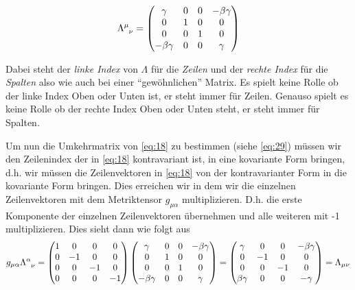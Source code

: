 \begin{equation}
  \label{eq:18}
    \Lambda^\mu_{\hphantom\mu \nu} =
  \begin{pmatrix}
    \gamma&0&0&-\beta\gamma\\
    0&1&0&0\\
    0&0&1&0\\
    -\beta\gamma&0&0&\gamma
  \end{pmatrix}
\end{equation}

Dabei steht der \emph{linke Index} von \(\Lambda\) für die \emph{Zeilen} und
der \emph{rechte Index} für die \emph{Spalten} also wie auch bei einer
``gewöhnlichen'' Matrix. Es spielt keine Rolle ob der linke Index Oben oder
Unten ist, er steht immer für Zeilen. Genauso spielt es keine Rolle ob der rechte
Index Oben oder Unten steht, er steht immer für Spalten.

Um nun die Umkehrmatrix von \eqref{eq:18} zu bestimmen (siehe \eqref{eq:29})
müssen wir den Zeilenindex der in \eqref{eq:18} kontravariant ist, in eine
kovariante Form bringen, d.h. wir müssen die Zeilenvektoren in \eqref{eq:18} von
der kontravarianter Form in die kovariante Form bringen. Dies erreichen wir in
dem wir die einzelnen Zeilenvektoren mit dem Metriktensor \(g_{\mu \alpha}\)
multiplizieren. D.h. die erste Komponente der einzelnen Zeilenvektoren übernehmen und alle weiteren mit -1 multiplizieren. Dies sieht dann wie folgt aus
\begin{equation}
  \label{eq:19}
     g_{\mu\alpha}\Lambda^\alpha_{\hphantom\alpha \nu} =
 \begin{pmatrix} 1&0&0&0 \\  0&-1&0&0 \\ 0&0&-1&0 \\ 0&0&0&-1  \end{pmatrix}
 \begin{pmatrix}
    \gamma&0&0&-\beta\gamma\\
    0&1&0&0\\
    0&0&1&0\\
    -\beta\gamma&0&0&\gamma
  \end{pmatrix} = 
  \begin{pmatrix}
    \gamma&0&0&-\beta\gamma\\
    0&-1&0&0\\
    0&0&-1&0\\
    \beta\gamma&0&0&-\gamma
  \end{pmatrix}
 = \Lambda_{\mu \nu}
\end{equation}

